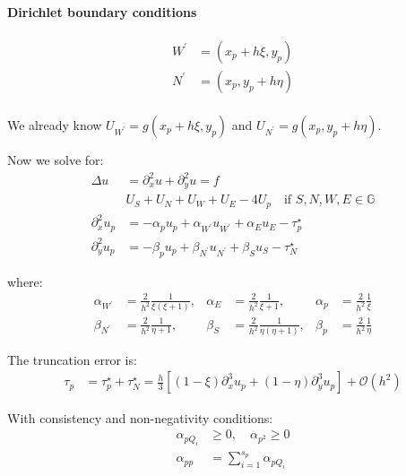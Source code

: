 \paragraph{Dirichlet boundary conditions}
\begin{align*}
  W^\prime & = (x_p + h \xi , y_p) \\
  N^\prime & = (x_p, y_p + h \eta) \\
\end{align*}

We already know \(U_{W^\prime} = g(x_p + h \xi, y_p)\) and \(U_{N^\prime} = g(x_p, y_p + h \eta)\).

Now we solve for:
\begin{align*}
  \Delta u &= \partial_x^2 u + \partial_y^2 u = f \\
  &U_S + U_N + U_W + U_E - 4U_p \quad \text{if } S,N,W,E \in \mathbb{G} \\
  \partial_x^2 u_p &= -\alpha_p u_p + \alpha_{W^\prime}u_{W^\prime} + \alpha_E u_E - \tau_p^\star \\
  \partial_y^2 u_p &= -\beta_p u_p + \beta_{N^\prime}u_{N^\prime} + \beta_S u_S - \tau_N^\star
\end{align*}

where:
\begin{align*}
  \alpha_{W^\prime} &= \frac{2}{h^2}\frac{1}{\xi (\xi + 1)}, &
  \alpha_E &= \frac{2}{h^2}\frac{1}{\xi + 1}, &
  \alpha_p &= \frac{2}{h^2}\frac{1}{\xi} \\
  \beta_{N^\prime} &= \frac{2}{h^2}\frac{1}{\eta + 1}, &
  \beta_S &= \frac{2}{h^2}\frac{1}{\eta (\eta + 1)}, &
  \beta_p &= \frac{2}{h^2}\frac{1}{\eta}
\end{align*}

The truncation error is:
\begin{align*}
  \tau_p &= \tau_p^\star + \tau_N^\star = \frac{h}{3}\left[(1-\xi)\partial_x^3 u_p + (1-\eta)\partial_y^3 u_p\right] + \mathcal{O}(h^2)
\end{align*}

With consistency and non-negativity conditions:
\begin{align*}
  \alpha_{pQ_i} &\geq 0, \quad \alpha_{p^2} \geq 0 \\
  \alpha_{pp} &= \sum_{i=1}^{s_p} \alpha_{pQ_i} \tag{consistency}
\end{align*}

